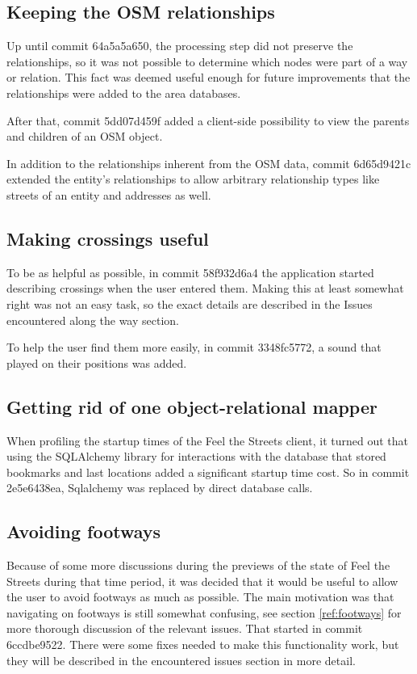 \documentclass[nolof,digital]{fithesis3}
\begin{document}
\subsection{Keeping the OSM relationships}
Up until commit 64a5a5a650, the processing step did not preserve the relationships, so it was not possible to determine which nodes were part of a way or relation. This fact was deemed useful enough for future improvements that the relationships were added to the area databases.

After that, commit 5dd07d459f added a client-side possibility to view the parents and children of an OSM object.

In addition to the relationships inherent from the OSM data, commit 6d65d9421c extended the entity's relationships to allow arbitrary relationship types like streets of an entity and addresses as well. 
\subsection{Making crossings useful}
To be as helpful as possible, in commit 58f932d6a4 the application started describing crossings when the user entered them. Making this at least somewhat right was not an easy task, so the exact details are described in the Issues encountered along the way section.

To help the user find them more easily, in commit 3348fc5772, a sound that played on their positions was added.
\subsection{Getting rid of one object-relational mapper}
When profiling the startup times of the Feel the Streets client, it turned out that using the SQLAlchemy library for interactions with the database that stored bookmarks and last locations added a significant startup time cost. So in commit 2e5e6438ea, Sqlalchemy was replaced by direct database calls.
\subsection{Avoiding footways}
Because of some more discussions during the previews of the state of Feel the Streets during that time period, it was decided that it would be useful to allow the user to avoid footways as much as possible. The main motivation was that navigating on footways is still somewhat confusing, see section \ref{ref:footways} for more thorough discussion of the relevant issues. That started in commit 6ccdbe9522. There were some fixes needed to make this functionality work, but they will be described in the encountered issues section in more detail.
\end{document}
